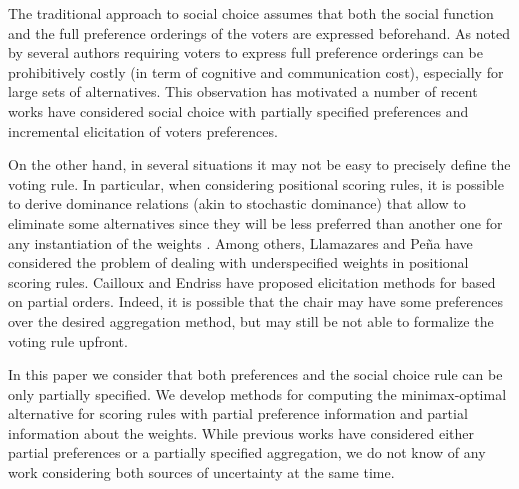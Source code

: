\documentclass[12pt]{article}
\begin{document}
The traditional approach to social choice assumes that both the social function and the full preference orderings of the voters are expressed beforehand. 
As noted by several authors requiring voters to express full preference orderings can be prohibitively costly (in term of cognitive and communication cost), especially for  large sets of alternatives.
This observation has motivated a number of recent works \cite{Xia2008,Kalech2011,Lu2011,Naamani-Dery2015} have considered social choice with partially specified preferences and incremental elicitation of voters preferences. %

On the other hand, in several situations it may not be easy to precisely define the voting rule.
In particular, when considering positional scoring rules, it is possible to derive dominance relations (akin to stochastic dominance) that allow to eliminate some alternatives since they will be less preferred than another one for any instantiation of the weights \cite{Stein1994}.
Among others, Llamazares and Pe{\~{n}}a \cite{Llamazares2013} have considered  the problem of dealing with underspecified weights in positional scoring rules.
Cailloux and Endriss \cite{Cailloux2014} have proposed elicitation methods for based on partial orders.
Indeed, it is possible that the chair may have some preferences over the desired aggregation method, but may still be not able to formalize the voting rule upfront.

In this paper we consider that both preferences and the social choice rule can be only partially specified.
We develop methods for computing the minimax-optimal alternative for scoring rules with partial preference information and partial information about the weights.
While previous works have considered either partial preferences or a partially specified aggregation, we do not know of any work considering both sources of uncertainty at the same time.

\end{document}

